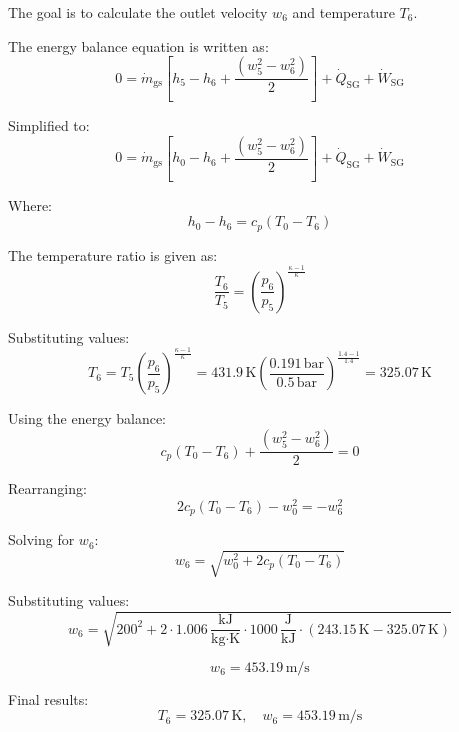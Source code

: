 The goal is to calculate the outlet velocity \( w_6 \) and temperature \( T_6 \).  

The energy balance equation is written as:  
\[
0 = \dot{m}_{\text{gs}} \left[ h_5 - h_6 + \frac{(w_5^2 - w_6^2)}{2} \right] + \dot{Q}_{\text{SG}} + \dot{W}_{\text{SG}}
\]  

Simplified to:  
\[
0 = \dot{m}_{\text{gs}} \left[ h_0 - h_6 + \frac{(w_5^2 - w_6^2)}{2} \right] + \dot{Q}_{\text{SG}} + \dot{W}_{\text{SG}}
\]  

Where:  
\[
h_0 - h_6 = c_p (T_0 - T_6)
\]  

The temperature ratio is given as:  
\[
\frac{T_6}{T_5} = \left( \frac{p_6}{p_5} \right)^{\frac{\kappa - 1}{\kappa}}  
\]  

Substituting values:  
\[
T_6 = T_5 \left( \frac{p_6}{p_5} \right)^{\frac{\kappa - 1}{\kappa}} = 431.9 \, \text{K} \left( \frac{0.191 \, \text{bar}}{0.5 \, \text{bar}} \right)^{\frac{1.4 - 1}{1.4}} = 325.07 \, \text{K}
\]  

Using the energy balance:  
\[
c_p (T_0 - T_6) + \frac{(w_5^2 - w_6^2)}{2} = 0
\]  

Rearranging:  
\[
2 c_p (T_0 - T_6) - w_0^2 = -w_6^2
\]  

Solving for \( w_6 \):  
\[
w_6 = \sqrt{w_0^2 + 2 c_p (T_0 - T_6)}
\]  

Substituting values:  
\[
w_6 = \sqrt{200^2 + 2 \cdot 1.006 \, \frac{\text{kJ}}{\text{kg·K}} \cdot 1000 \, \frac{\text{J}}{\text{kJ}} \cdot (243.15 \, \text{K} - 325.07 \, \text{K})}
\]  

\[
w_6 = 453.19 \, \text{m/s}
\]  

Final results:  
\[
T_6 = 325.07 \, \text{K}, \quad w_6 = 453.19 \, \text{m/s}
\]